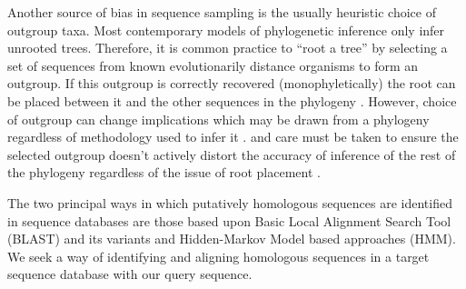 Another source of bias in sequence sampling is the usually heuristic choice
of outgroup taxa. Most contemporary models of phylogenetic inference only infer unrooted trees. 
Therefore, it is common practice to ``root a tree'' by selecting a set of sequences from known evolutionarily distance
organisms to form an outgroup. If this outgroup is correctly recovered (monophyletically) the root can be placed between
it and the other sequences in the phylogeny \citep{Yang2012}.  
However, choice of outgroup can change implications which may be drawn from
a phylogeny regardless of methodology used to infer it \citep{Milinkovitch1996}.
and care must be taken to ensure the selected outgroup doesn't actively
distort the accuracy of inference of the rest of the phylogeny regardless
of the issue of root placement \citep{Milinkovitch1998}.

The two principal ways in which putatively homologous sequences are identified in
sequence databases are those based upon Basic Local Alignment Search Tool (BLAST) and
its variants and Hidden-Markov Model based approaches (HMM).
We seek a way of identifying and aligning homologous sequences in 
a target sequence database with our query sequence.

